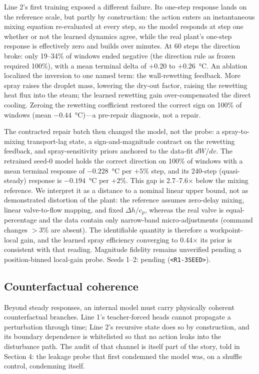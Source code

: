 \documentclass{article}
\begin{document}
Line 2's first training exposed a different failure. Its one-step response lands on
the reference scale, but partly by construction: the action enters an instantaneous
mixing equation re-evaluated at every step, so the model responds at step one whether
or not the learned dynamics agree, while the real plant's one-step response is
effectively zero and builds over minutes. At 60 steps the direction broke: only
19--34\% of windows ended negative (the direction rule as frozen required 100\%), with
a mean terminal delta of $+0.20$ to $+0.26$~\si{\degreeCelsius}. An ablation
localized the inversion to one named term: the wall-rewetting feedback. More spray
raises the droplet mass, lowering the dry-out factor, raising the rewetting heat flux
into the steam; the learned rewetting gain over-compensated the direct cooling.
Zeroing the rewetting coefficient restored the correct sign on 100\% of windows (mean
$-0.44$~\si{\degreeCelsius})---a pre-repair diagnosis, not a repair.

The contracted repair batch then changed the model, not the probe: a
spray-to-mixing transport-lag state, a sign-and-magnitude contract on the rewetting
feedback, and spray-sensitivity priors anchored to the data-fit $dW/dv$. The
retrained seed-0 model holds the correct direction on 100\% of windows with a mean
terminal response of $-0.228$~\si{\degreeCelsius} per $+5\%$ step, and its 240-step
(quasi-steady) response is $-0.194$~\si{\degreeCelsius} per $+2\%$. This gap is 2.7--7.6$\times$ below the mixing reference. We interpret it as a distance
to a nominal linear upper bound, not as demonstrated distortion of the plant: the
reference assumes zero-delay mixing, linear valve-to-flow mapping, and fixed
$\Delta h/c_p$, whereas the real valve is equal-percentage and the data contain only
narrow-band micro-adjustments (command changes $>$3\% are absent). The identifiable
quantity is therefore a workpoint-local gain, and the learned spray efficiency
converging to 0.44$\times$ its prior is consistent with that reading. Magnitude
fidelity remains unverified pending a
position-binned local-gain probe. Seeds 1--2: pending (\texttt{<R1-3SEED>}).

\subsection{Counterfactual coherence}

Beyond steady responses, an internal model must carry physically coherent
counterfactual branches. Line 1's teacher-forced heads cannot propagate a perturbation
through time; Line 2's recursive state does so by construction, and its boundary
dependence is whitelisted so that no action leaks into the disturbance path. The
audit of that channel is itself part of the story, told in Section 4: the leakage
probe that first condemned the model was, on a shuffle control, condemning itself.
\end{document}
